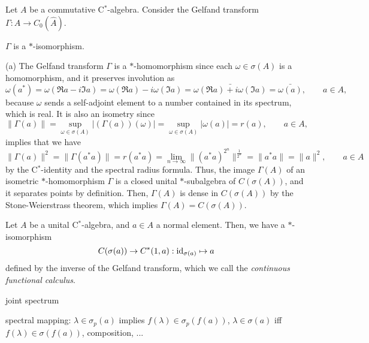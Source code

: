 \documentclass{../../large}
\begin{document}
\begin{prb}
Let $A$ be a commutative C$^*$-algebra.
Consider the Gelfand transform $\Gamma:A\to C_0(\hat A)$.
\begin{parts}
\item $\Gamma$ is a $*$-isomorphism.
\end{parts}
\end{prb}
\begin{pf}

(a)
The Gelfand transform $\Gamma$ is a $*$-homomorphism since each $\omega\in\sigma(A)$ is a homomorphism, and it preserves involution as
\[\omega(a^*)=\omega(\Re a-i\Im a)=\omega(\Re a)-i\omega(\Im a)=\bar{\omega(\Re a)+i\omega(\Im a)}=\bar{\omega(a)},\qquad a\in A,\]
because $\omega$ sends a self-adjoint element to a number contained in its spectrum, which is real.
It is also an isometry since 
\[\|\Gamma(a)\|=\sup_{\omega\in\sigma(A)}|(\Gamma(a))(\omega)|=\sup_{\omega\in\sigma(A)}|\omega(a)|=r(a),\qquad a\in A,\]
implies that we have
\[\|\Gamma(a)\|^2=\|\Gamma(a^*a)\|=r(a^*a)=\lim_{n\to\infty}\|(a^*a)^{2^n}\|^{\frac1{2^n}}=\|a^*a\|=\|a\|^2,\qquad a\in A\]
by the C$^*$-identity and the spectral radius formula.
Thus, the image $\Gamma(A)$ of an isometric $*$-homomorphism $\Gamma$ is a closed unital $*$-subalgebra of $C(\sigma(A))$, and it separates points by definition.
Then, $\Gamma(A)$ is dense in $C(\sigma(A))$ by the Stone-Weierstrass theorem, which implies $\Gamma(A)=C(\sigma(A))$.
\end{pf}

\begin{prb}
Let $A$ be a unital C$^*$-algebra, and $a\in A$ a normal element.
Then, we have a $*$-isomorphism
\[C(\sigma(a))\to C^*(1,a):\operatorname{id}_{\sigma(a)}\mapsto a\]
defined by the inverse of the Gelfand transform, which we call the \emph{continuous functional calculus}.

joint spectrum

\begin{parts}
\item spectral mapping: $\lambda\in\sigma_p(a)$ implies $f(\lambda)\in\sigma_p(f(a))$, $\lambda\in\sigma(a)$ iff $f(\lambda)\in\sigma(f(a))$, composition, ...
\end{parts}
\end{prb}
\end{document}
